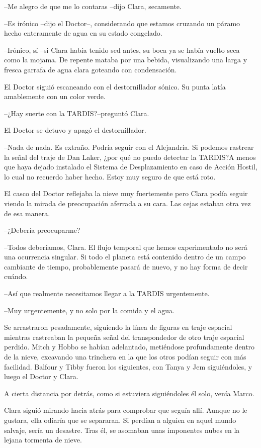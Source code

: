 {--Me alegro de que me lo contaras --dijo Clara, secamente.}

{--Es irónico --dijo el Doctor--, considerando que estamos cruzando un
páramo hecho enteramente de agua en su estado congelado.}

{--Irónico, sí --si Clara había tenido sed antes, su boca ya se había
 vuelto seca como la mojama. De repente mataba por una bebida,
 visualizando una larga y fresca garrafa de agua clara goteando con
condensación.}

{El Doctor siguió escaneando con el destornillador sónico. Su punta latía
amablemente con un color verde.}

{--¿Hay suerte con la TARDIS?\@ --preguntó Clara.}

{El Doctor se detuvo y apagó el destornillador.}

{--Nada de nada. Es extraño. Podría seguir con el Alejandría. Si podemos
 rastrear la señal del traje de Dan Laker, ¿por qué no puedo detectar la
 TARDIS?\@ A menos que haya dejado instalado el Sistema de Desplazamiento
 en caso de Acción Hostil, lo cual no recuerdo haber hecho. Estoy muy
seguro de que está roto.}

{El casco del Doctor reflejaba la nieve muy fuertemente pero Clara podía
 seguir viendo la mirada de preocupación aferrada a su cara. Las cejas
estaban otra vez de esa manera.}

{--¿Debería preocuparme?}

{--Todos deberíamos, Clara. El flujo temporal que hemos experimentado no
 será una ocurrencia singular. Si todo el planeta está contenido dentro
 de un campo cambiante de tiempo, probablemente pasará de nuevo, y no hay
forma de decir cuándo.}

{--Así que realmente necesitamos llegar a la TARDIS urgentemente.}

{--Muy urgentemente, y no solo por la comida y el agua.}

{Se arrastraron pesadamente, siguiendo la línea de figuras en traje
 espacial mientras rastreaban la pequeña señal del transpondedor de otro
 traje espacial perdido. Mitch y Hobbo se habían adelantado, metiéndose
 profundamente dentro de la nieve, excavando una trinchera en la que los
 otros podían seguir con más facilidad. Balfour y Tibby fueron los
siguientes, con Tanya y Jem siguiéndoles, y luego el Doctor y Clara.}

{A cierta distancia por detrás, como si estuviera siguiéndoles él solo,
venía Marco.}

{Clara siguió mirando hacia atrás para comprobar que seguía allí. Aunque
 no le gustara, ella odiaría que se separaran. Si perdían a alguien en
 aquel mundo salvaje, sería un desastre. Tras él, se asomaban unas
imponentes nubes en la lejana tormenta de nieve.}


